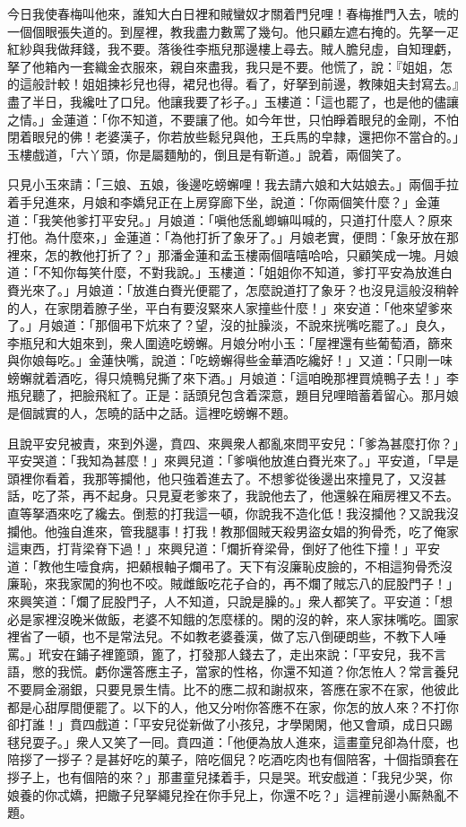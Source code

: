 今日我使春梅叫他來，誰知大白日裡和賊蠻奴才關着門兒哩！春梅推門入去，唬的一個個眼張失道的。{}到屋裡，教我盡力數罵了幾句。他只顧左遮右掩的。先拏一疋紅紗與我做拜錢，我不要。落後徃李瓶兒那邊樓上尋去。賊人膽兒虛，自知理虧，拏了他箱內一套織金衣服來，親自來盡我，我只是不要。他慌了，說：『姐姐，怎的這般計較！姐姐揀衫兒也得，裙兒也得。看了，好拏到前邊，教陳姐夫封寫去。』盡了半日，我纔吐了口兒。他讓我要了衫子。」玉樓道：「這也罷了，也是他的儘讓之情。」金蓮道：「你不知道，不要讓了他。如今年世，只怕睜着眼兒的金剛，不怕閉着眼兒的佛！老婆漢子，你若放些鬆兒與他，王兵馬的皁隸，還把你不當㒲的。」玉樓戲道，「六丫頭，你是屬麵觔的，倒且是有靳道。」說着，兩個笑了。

只見小玉來請：「三娘、五娘，後邊吃螃蠏哩！我去請六娘和大姑娘去。」兩個手拉着手兒進來，月娘和李嬌兒正在上房穿廊下坐，說道：「你兩個笑什麼？」金蓮道：「我笑他爹打平安兒。」月娘道：「嗔他恁亂蝍䗫叫喊的，只道打什麼人？原來打他。為什麼來，」金蓮道：「為他打折了象牙了。」月娘老實，便問：「象牙放在那裡來，怎的教他打折了？」那潘金蓮和孟玉樓兩個嘻嘻哈哈，只顧笑成一塊。月娘道：「不知你每笑什麼，不對我說。」玉樓道：「姐姐你不知道，爹打平安為放進白賚光來了。」月娘道：「放進白賚光便罷了，怎麼說道打了象牙？也沒見這般沒稍幹的人，在家閉着膫子坐，平白有要沒緊來人家撞些什麼！」來安道：「他來望爹來了。」月娘道：「那個弔下炕來了？望，沒的扯臊淡，不說來挄嘴吃罷了。」良久，李瓶兒和大姐來到，衆人圍遶吃螃蠏。月娘分咐小玉：「屋裡還有些葡萄酒，篩來與你娘每吃。」金蓮快嘴，說道：「吃螃蠏得些金華酒吃纔好！」又道：「只剛一味螃蠏就着酒吃，得只燒鴨兒撕了來下酒。」月娘道：「這咱晚那裡買燒鴨子去！」李瓶兒聽了，把臉飛紅了。正是：話頭兒包含着深意，題目兒哩暗蓄着留心。那月娘是個誠實的人，怎曉的話中之話。這裡吃螃蠏不題。

且說平安兒被責，來到外邊，賁四、來興衆人都亂來問平安兒：「爹為甚麼打你？」平安哭道：「我知為甚麼！」來興兒道：「爹嗔他放進白賚光來了。」平安道，「早是頭裡你看着，我那等攔他，他只強着進去了。不想爹從後邊出來撞見了，又沒甚話，吃了茶，再不起身。只見夏老爹來了，我說他去了，他還躲在廂房裡又不去。直等拏酒來吃了纔去。倒惹的打我這一頓，你說我不造化低！我沒攔他？又說我沒攔他。他強自進來，管我腿事！打我！教那個賊天殺男盜女娼的狗骨禿，吃了俺家這東西，打背梁脊下過！」來興兒道：「爛折脊梁骨，倒好了他徃下撞！」平安道：「教他生噎食病，把顙根軸子爛弔了。天下有沒廉恥皮臉的，不相這狗骨禿沒廉恥，來我家闖的狗也不咬。賊雌飯吃花子㒲的，再不爛了賊忘八的屁股門子！」來興笑道：「爛了屁股門子，人不知道，只說是臊的。」衆人都笑了。平安道：「想必是家裡沒晚米做飯，老婆不知餓的怎麼樣的。閑的沒的幹，來人家抹嘴吃。圖家裡省了一頓，也不是常法兒。不如教老婆養漢，做了忘八倒硬朗些，不教下人唾罵。」玳安在鋪子裡篦頭，篦了，打發那人錢去了，走出來說：「平安兒，我不言語，憋的我慌。虧你還答應主子，當家的性格，你還不知道？你怎恠人？常言養兒不要屙金溺銀，只要見景生情。比不的應二叔和謝叔來，答應在家不在家，他彼此都是心甜厚間便罷了。以下的人，他又分咐你答應不在家，你怎的放人來？不打你卻打誰！」賁四戲道：「平安兒從新做了小孩兒，才學閑閑，他又會頑，成日只踢毬兒耍子。」衆人又笑了一囘。賁四道：「他便為放人進來，這畫童兒卻為什麼，也陪拶了一拶子？是甚好吃的菓子，陪吃個兒？吃酒吃肉也有個陪客，十個指頭套在拶子上，也有個陪的來？」那畫童兒揉着手，只是哭。玳安戲道：「我兒少哭，你娘養的你忒嬌，把饊子兒拏繩兒拴在你手兒上，你還不吃？」這裡前邊小厮熱亂不題。

